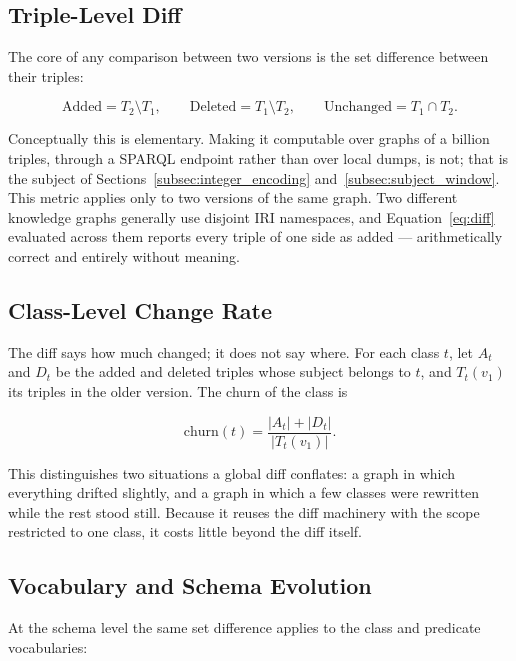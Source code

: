 \subsection{Triple-Level Diff}

The core of any comparison between two versions is the set difference between
their triples:

\begin{equation}
  \mathrm{Added} = T_2 \setminus T_1,
  \qquad
  \mathrm{Deleted} = T_1 \setminus T_2,
  \qquad
  \mathrm{Unchanged} = T_1 \cap T_2.
  \label{eq:diff}
\end{equation}

Conceptually this is elementary. Making it computable over graphs of a billion
triples, through a SPARQL endpoint rather than over local dumps, is not; that is
the subject of Sections~\ref{subsec:integer_encoding}
and~\ref{subsec:subject_window}. This metric applies only to two versions of the
same graph. Two different knowledge graphs generally use disjoint \ac{IRI}
namespaces, and Equation~\ref{eq:diff} evaluated across them reports every triple
of one side as added --- arithmetically correct and entirely without meaning.

\subsection{Class-Level Change Rate}
\label{subsec:churn_metric}

The diff says how much changed; it does not say where. For each class $t$, let
$A_t$ and $D_t$ be the added and deleted triples whose subject belongs to $t$,
and $T_t(v_1)$ its triples in the older version. The churn of the class is

\begin{equation}
  \mathrm{churn}(t) = \frac{|A_t| + |D_t|}{|T_t(v_1)|}.
  \label{eq:churn}
\end{equation}

This distinguishes two situations a global diff conflates: a graph in which
everything drifted slightly, and a graph in which a few classes were rewritten
while the rest stood still. Because it reuses the diff machinery with the scope
restricted to one class, it costs little beyond the diff itself.

\subsection{Vocabulary and Schema Evolution}

At the schema level the same set difference applies to the class and predicate
vocabularies:

